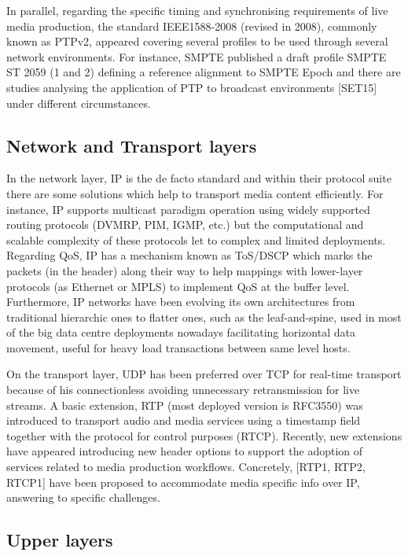In parallel, regarding the specific timing and synchronising requirements of live media production,
the standard IEEE1588-2008 (revised in 2008), commonly known as PTPv2, appeared covering
several profiles to be used through several network environments. For instance, SMPTE published a
draft profile SMPTE ST 2059 (1 and 2) defining a reference alignment to SMPTE Epoch and there
are studies analysing the application of PTP to broadcast environments [SET15] under different
circumstances.

\subsection{Network and Transport layers}

In the network layer, IP is the de facto standard and within their protocol suite there are some solutions
which help to transport media content efficiently. For instance, IP supports multicast paradigm
operation using widely supported routing protocols (DVMRP, PIM, IGMP, etc.) but the
computational and scalable complexity of these protocols let to complex and limited deployments.
Regarding QoS, IP has a mechanism known as ToS/DSCP which marks the packets (in the header)
along their way to help mappings with lower-layer protocols (as Ethernet or MPLS) to implement
QoS at the buffer level. Furthermore, IP networks have been evolving its own architectures from
traditional hierarchic ones to flatter ones, such as the leaf-and-spine, used in most of the big data
centre deployments nowadays facilitating horizontal data movement, useful for heavy load
transactions between same level hosts.

On the transport layer, UDP has been preferred over TCP for real-time transport because of his
connectionless avoiding unnecessary retransmission for live streams. A basic extension, RTP (most
deployed version is RFC3550) was introduced to transport audio and media services using a
timestamp field together with the protocol for control purposes (RTCP). Recently, new extensions
have appeared introducing new header options to support the adoption of services related to media
production workflows. Concretely, [RTP1, RTP2, RTCP1] have been proposed to accommodate
media specific info over IP, answering to specific challenges.

\subsection{Upper layers}

